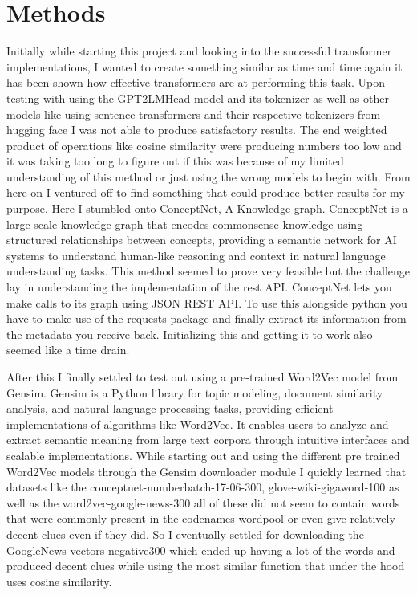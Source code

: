 \documentclass[11pt,a4paper]{article}
\begin{document}
\section{Methods}

Initially while starting this project and looking into the successful transformer implementations, I wanted to create something similar as time and time again it has been shown how effective transformers are at performing this task. Upon testing with using the GPT2LMHead model and its tokenizer as well as other models like using sentence transformers and their respective tokenizers from hugging face I was not able to produce satisfactory results. The end weighted product of operations like cosine similarity were producing numbers too low and it was taking too long to figure out if this was because of my limited understanding of this method or just using the wrong models to begin with.
From here on I ventured off to find something that could produce better results for my purpose. Here I stumbled onto ConceptNet, A Knowledge graph. ConceptNet is a large-scale knowledge graph that encodes commonsense knowledge using structured relationships between concepts, providing a semantic network for AI systems to understand human-like reasoning and context in natural language understanding tasks. This method seemed to prove very feasible but the challenge lay in understanding the implementation of the rest API. ConceptNet lets you make calls to its graph using JSON REST API. To use this alongside python you have to make use of the requests package and finally extract its information from the metadata you receive back. Initializing this and getting it to work also seemed like a time drain. 

After this I finally settled to test out using a pre-trained Word2Vec model from Gensim. Gensim is a Python library for topic modeling, document similarity analysis, and natural language processing tasks, providing efficient implementations of algorithms like Word2Vec. It enables users to analyze and extract semantic meaning from large text corpora through intuitive interfaces and scalable implementations. While starting out and using the different pre trained Word2Vec models through the Gensim downloader module I quickly learned that datasets like the conceptnet-numberbatch-17-06-300, glove-wiki-gigaword-100 as well as the word2vec-google-news-300 all of these did not seem to contain words that were commonly present in the codenames wordpool or even give relatively decent clues even if they did. So I eventually settled for downloading the GoogleNews-vectors-negative300 which ended up having a lot of the words and produced decent clues while using the most similar function that under the hood uses cosine similarity. 
\end{document}
